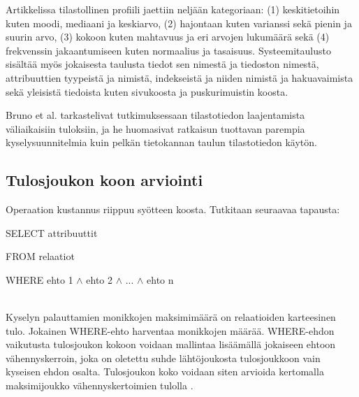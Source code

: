 \documentclass[finnish]{tktltiki2}
\theoremstyle{definition}
\theoremstyle{remark}
\begin{document}
Artikkelissa tilastollinen profiili jaettiin neljään kategoriaan: (1) keskitietoihin kuten moodi, mediaani ja keskiarvo,  (2) hajontaan kuten varianssi sekä pienin ja suurin arvo, (3) kokoon kuten mahtavuus ja eri arvojen lukumäärä sekä (4) frekvenssin jakaantumiseen kuten normaalius ja tasaisuus. Systeemitaulusto sisältää myös jokaisesta taulusta tiedot sen nimestä ja tiedoston nimestä,  attribuuttien tyypeistä ja nimistä, indekseistä ja niiden nimistä ja hakuavaimista sekä yleisistä tiedoista kuten sivukoosta ja puskurimuistin koosta.

Bruno et al. tarkastelivat tutkimuksessaan \cite{bruno2002exploiting} tilastotiedon laajentamista väliaikaisiin tuloksiin, ja he huomasivat ratkaisun tuottavan parempia kyselysuunnitelmia kuin pelkän tietokannan taulun tilastotiedon käytön.

\subsection{Tulosjoukon koon arviointi}
Operaation kustannus riippuu syötteen koosta. Tutkitaan seuraavaa tapausta:
\newline

\begin{frame}

SELECT attribuuttit

FROM relaatiot

WHERE ehto 1 $\wedge$ ehto 2 $\wedge$ ... $\wedge$ ehto n
\end{frame}
\\\newline
Kyselyn palauttamien monikkojen maksimimäärä on relaatioiden karteesinen tulo. Jokainen WHERE-ehto harventaa monikkojen määrää. WHERE-ehdon vaikutusta tulosjoukon kokoon voidaan mallintaa lisäämällä jokaiseen ehtoon vähennyskerroin, joka on oletettu suhde lähtöjoukosta tulosjoukkoon vain kyseisen ehdon osalta. 
Tulosjoukon koko voidaan siten arvioida kertomalla maksimijoukko vähennyskertoimien tulolla \cite{ramakrishnan2003database}. 
\end{document}
